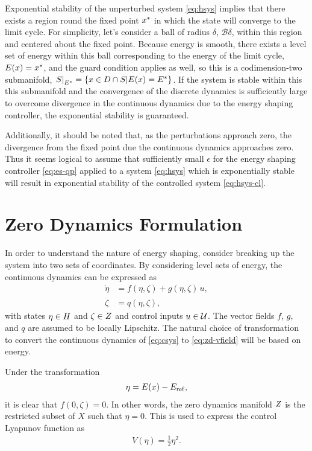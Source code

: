 \documentclass[twocolumn]{article}
\begin{document}
Exponential stability of the unperturbed system \eqref{eq:hsys} implies that there exists a region round the fixed point $x^{*}$ in which the state will converge to the limit cycle.
%
For simplicity, let's consider a ball of radius $\delta$, $\mathcal{B}\delta$, within this region and centered about the fixed point.
%
Because energy is smooth, there exists a level set of energy within this ball corresponding to the energy of the limit cycle, $E(x) = x^{*}$, and the guard condition applies as well, so this is a codimension-two submanifold, $\left.S\right|_{E^{*}} = \{ x \in D \cap S | E(x) = E^{*} \}$.
%
If the system is stable within this this submanifold and the convergence of the discrete dynamics is sufficiently large to overcome divergence in the continuous dynamics due to the energy shaping controller, the exponential stability is guaranteed.


Additionally, it should be noted that, as the perturbations approach zero, the divergence from the fixed point due the continuous dynamics approaches zero.
%
Thus it seems logical to assume that sufficiently small $\epsilon$ for the energy shaping controller \eqref{eq:es-qp} applied to a system \eqref{eq:hsys} which is exponentially stable will result in exponential stability of the controlled system \eqref{eq:hsys-cl}.

\section{Zero Dynamics Formulation}

In order to understand the nature of energy shaping, consider breaking up the system into two sets of coordinates.
%
By considering level sets of energy, the continuous dynamics can be expressed as
\begin{align}
  \nonumber
  {\dot \eta} &= f(\eta, \zeta) + g(\eta, \zeta) \, u,\\
  {\dot \zeta} &= q(\eta, \zeta),
  \label{eq:zd-vfield}
\end{align}
%
with states $\eta \in H$ and $\zeta \in Z$ and control inputs $u \in \mathcal{U}$.
%
The vector fields $f$, $g$, and $q$ are assumed to be locally Lipschitz.
%
The natural choice of transformation to convert the continuous dynamics of \eqref{eq:csys} to \eqref{eq:zd-vfield} will be based on energy.

Under the transformation
\begin{align}
  \eta = E(x) - E_{\mathrm{ref}},
\end{align}
it is clear that $f(0, \zeta) = 0$.
%
In other words, the zero dynamics manifold $Z$ is the restricted subset of $X$ such that $\eta = 0$.
%
This is used to express the control Lyapunov function as
\begin{align}
  V(\eta) = \frac{1}{2} \eta^{2}.
\end{align}
\end{document}
